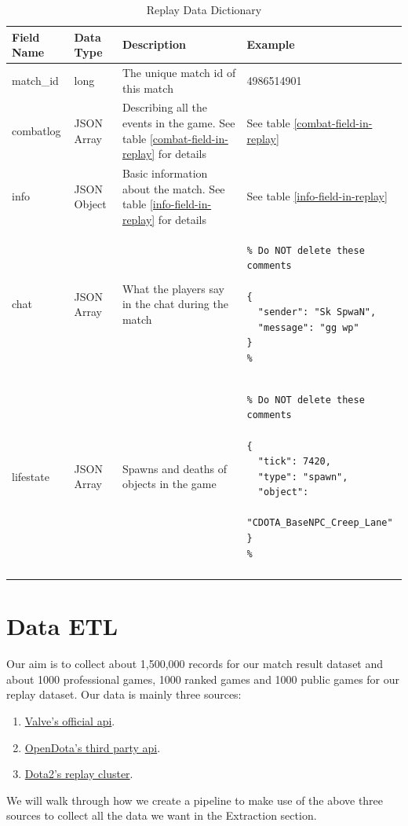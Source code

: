 \documentclass{article}
\newenvironment{json}{%
    \VerbatimEnvironment
    \begin{verbatim}% Do NOT delete these comments
    }% Otherwise there will be error when compiling
    {%
    \end{verbatim}%
}
\begin{document}
\begin{longtable}{|p{2cm}|p{2cm}|p{4.5cm}|p{5cm}|}

\hline
\textbf{Field Name} & \textbf{Data Type} & \textbf{Description}  & \textbf{Example} \\
\hline
\endhead

match\_id & long & The unique match id of this match & 4986514901\\\hline
combatlog & JSON Array & Describing all the events in the game. See table \ref{combat-field-in-replay} for details & See table \ref{combat-field-in-replay} \\\hline
info & JSON Object & Basic information about the match. See table \ref{info-field-in-replay} for details & See table \ref{info-field-in-replay}
\\\hline
chat &  JSON Array & What the players say in the chat during the match &
\begin{minipage}{4.99cm}
\begin{json}
{
  "sender": "Sk SpwaN",
  "message": "gg wp"
}
\end{json}
\end{minipage}
\\\hline
lifestate & JSON Array & Spawns and deaths of objects in the game &
\begin{minipage}{4.99cm}
\begin{json}
{
  "tick": 7420,
  "type": "spawn",
  "object":
    "CDOTA_BaseNPC_Creep_Lane"
}
\end{json}
\end{minipage}
\\\hline
\caption{Replay Data Dictionary}
\label{replay-data-dictionary}
\end{longtable}

\section{Data ETL}

Our aim is to collect about 1,500,000 records for our match result dataset and about 1000 professional games, 1000 ranked games and 1000 public games for our replay dataset. Our data is mainly three sources:
\begin{enumerate}
\item \href{https://wiki.teamfortress.com/wiki/WebAPI/}{Valve's official api}.
\item \href{https://docs.opendota.com/}{OpenDota's third party api}.
\item \href{https://dev.dota2.com/showthread.php?t=47115}{Dota2's replay cluster}.
\end{enumerate}
We will walk through how we create a pipeline to make use of the above three sources to collect all the data we want in the Extraction section.
\end{document}
